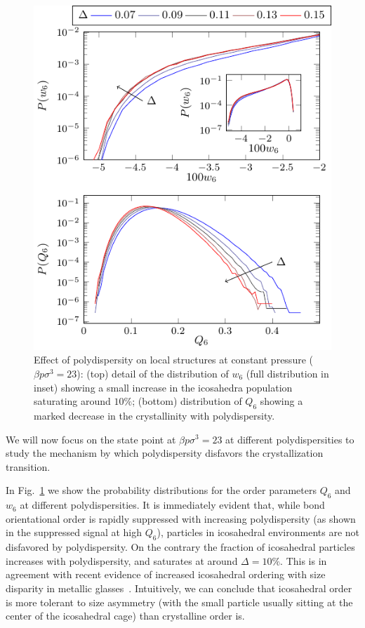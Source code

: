 \documentclass[twocolumn,superscriptaddress]{revtex4}
\begin{document}
\begin{figure}
 \centering
 \includegraphics{fig_polydistrib}
 \caption{Effect of polydispersity on local structures at constant pressure ($\beta p\sigma^3=23$): (top) detail of the distribution of $w_6$ (full distribution in inset) showing a small increase in the icosahedra population saturating around $10\%$; (bottom) distribution of $Q_6$ showing a marked decrease in the crystallinity with polydispersity.}
 \label{fig:polydispersity}
\end{figure}

We will now focus on the state point at $\beta p\sigma^3=23$ at different polydispersities to
study the mechanism by which polydispersity disfavors the crystallization transition.

In Fig.~\ref{fig:polydispersity} we show the probability distributions for the order
parameters $Q_6$ and $w_6$ at different polydispersities. It is immediately
evident that, while bond orientational order is rapidly suppressed with increasing
polydispersity (as shown in the suppressed signal at high $Q_6$), particles in icosahedral
environments are not disfavored by polydispersity. On the contrary the fraction of
icosahedral particles increases with polydispersity, and saturates at around $\Delta=10\%$.
This is in agreement with recent evidence of increased icosahedral ordering with size disparity
in metallic glasses~\cite{Shimono2012}. Intuitively, we can conclude that icosahedral order is more tolerant to size
asymmetry (with the small particle usually sitting at the center of the icosahedral cage) than crystalline order is.
\end{document}
